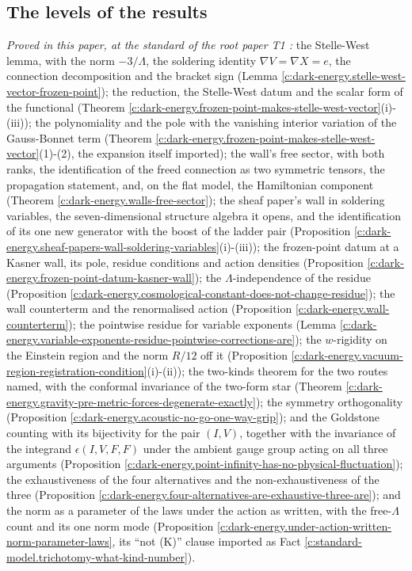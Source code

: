 \documentclass[11pt]{article}
\theoremstyle{definition}
\theoremstyle{plain}
\begin{document}
\subsection*{The levels of the results}
\label{c:note.dark-energy.setting-levels-results}
\emph{Proved in this paper, at the standard of the root paper T1 \cite{ButlerT1}:} the Stelle-West lemma, with the norm $-3/\Lambda$, the soldering identity $\nabla V = \nabla X = e$, the connection decomposition and the bracket sign (Lemma \ref{c:dark-energy.stelle-west-vector-frozen-point}); the reduction, the Stelle-West datum and the scalar form of the functional (Theorem \ref{c:dark-energy.frozen-point-makes-stelle-west-vector}(i)-(iii)); the polynomiality and the pole with the vanishing interior variation of the Gauss-Bonnet term (Theorem \ref{c:dark-energy.frozen-point-makes-stelle-west-vector}(1)-(2), the expansion itself imported); the wall's free sector, with both ranks, the identification of the freed connection as two symmetric tensors, the propagation statement, and, on the flat model, the Hamiltonian component (Theorem \ref{c:dark-energy.walls-free-sector}); the sheaf paper's wall in soldering variables, the seven-dimensional structure algebra it opens, and the identification of its one new generator with the boost of the ladder pair (Proposition \ref{c:dark-energy.sheaf-papers-wall-soldering-variables}(i)-(iii)); the frozen-point datum at a Kasner wall, its pole, residue conditions and action densities (Proposition \ref{c:dark-energy.frozen-point-datum-kasner-wall}); the $\Lambda$-independence of the residue (Proposition \ref{c:dark-energy.cosmological-constant-does-not-change-residue}); the wall counterterm and the renormalised action (Proposition \ref{c:dark-energy.wall-counterterm}); the pointwise residue for variable exponents (Lemma \ref{c:dark-energy.variable-exponents-residue-pointwise-corrections-are}); the $w$-rigidity on the Einstein region and the norm $R/12$ off it (Proposition \ref{c:dark-energy.vacuum-region-registration-condition}(i)-(ii)); the two-kinds theorem for the two routes named, with the conformal invariance of the two-form star (Theorem \ref{c:dark-energy.gravity-pre-metric-forces-degenerate-exactly}); the symmetry orthogonality (Proposition \ref{c:dark-energy.acoustic-no-go-one-way-grip}); and the Goldstone counting with its bijectivity for the pair $(I,V)$, together with the invariance of the integrand $\epsilon(I,V,F,F)$ under the ambient gauge group acting on all three arguments (Proposition \ref{c:dark-energy.point-infinity-has-no-physical-fluctuation}); the exhaustiveness of the four alternatives and the non-exhaustiveness of the three (Proposition \ref{c:dark-energy.four-alternatives-are-exhaustive-three-are}); and the norm as a parameter of the laws under the action as written, with the free-$\Lambda$ count and its one norm mode (Proposition \ref{c:dark-energy.under-action-written-norm-parameter-laws}, its ``not (K)'' clause imported as Fact \ref{c:standard-model.trichotomy-what-kind-number}).
\end{document}
